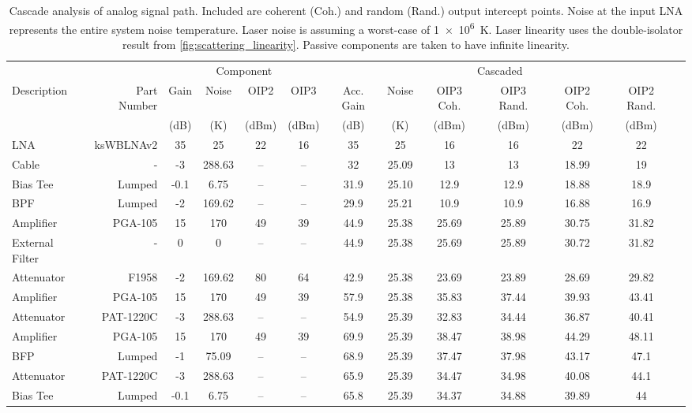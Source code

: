 \newpage
\begin{landscape}
\begin{table}[!htp]\centering
\caption[Cascade analysis of analog signal path]{Cascade analysis of analog signal path. Included are coherent (Coh.) and random (Rand.) output intercept points. Noise at the input LNA represents the entire system noise temperature. Laser noise is assuming a worst-case of \qty{1e6}{K}. Laser linearity uses the double-isolator result from \autoref{fig:scattering_linearity}. Passive components are taken to have infinite linearity.}\label{tab:casc_asp}
\scriptsize
\begin{tabular}{lr|cccc|ccccccc}\toprule
& &\multicolumn{4}{c}{Component} &\multicolumn{6}{c}{Cascaded} \\\cmidrule{3-12}
Description &Part Number &Gain  &Noise&OIP2 &OIP3 &Acc. Gain &Noise &OIP3 Coh. &OIP3 Rand. &OIP2 Coh. &OIP2 Rand. \\
 & & (dB) & (K) & (dBm) & (dBm) & (dB) & (K) & (dBm) & (dBm) & (dBm) & (dBm) \\\midrule
LNA             & ksWBLNAv2   & 35   & 25     & 22 & 16 & 35   & 25    & 16    & 16    & 22    & 22    \\
Cable           & -           & -3   & 288.63 & -- & -- & 32   & 25.09 & 13    & 13    & 18.99 & 19 \\
Bias Tee        & Lumped      & -0.1 & 6.75   & -- & -- & 31.9 & 25.10 & 12.9  & 12.9  & 18.88 & 18.9 \\
BPF             & Lumped      & -2   & 169.62 & -- & -- & 29.9 & 25.21 & 10.9  & 10.9  & 16.88 & 16.9 \\
Amplifier       & PGA-105     & 15   & 170    & 49 & 39 & 44.9 & 25.38 & 25.69 & 25.89 & 30.75 & 31.82 \\
External Filter & -           & 0    & 0      & -- & -- & 44.9 & 25.38 & 25.69 & 25.89 & 30.72 & 31.82 \\
Attenuator      & F1958       & -2   & 169.62 & 80 & 64 & 42.9 & 25.38 & 23.69 & 23.89 & 28.69 & 29.82 \\
Amplifier       & PGA-105     & 15   & 170    & 49 & 39 & 57.9 & 25.38 & 35.83 & 37.44 & 39.93 & 43.41 \\
Attenuator      & PAT-1220C   & -3   & 288.63 & -- & -- & 54.9 & 25.39 & 32.83 & 34.44 & 36.87 & 40.41 \\
Amplifier       & PGA-105     & 15   & 170    & 49 & 39 & 69.9 & 25.39 & 38.47 & 38.98 & 44.29 & 48.11 \\
BFP             & Lumped      & -1   & 75.09  & -- & -- & 68.9 & 25.39 & 37.47 & 37.98 & 43.17 & 47.1 \\
Attenuator      & PAT-1220C   & -3   & 288.63 & -- & -- & 65.9 & 25.39 & 34.47 & 34.98 & 40.08 & 44.1 \\
Bias Tee        & Lumped      & -0.1 & 6.75   & -- & -- & 65.8 & 25.39 & 34.37 & 34.88 & 39.89 & 44 \\


\end{tabular}
\end{table}
\end{landscape}
